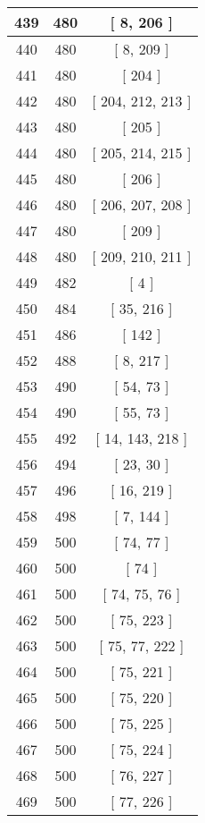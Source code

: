 \begin{center}
\begin{longtable}[H]{|| c c c ||}
439 & 480 & [ 8, 206 ]
\\\hline
440 & 480 & [ 8, 209 ]
\\\hline
441 & 480 & [ 204 ]
\\\hline
442 & 480 & [ 204, 212, 213 ]
\\\hline
443 & 480 & [ 205 ]
\\\hline
444 & 480 & [ 205, 214, 215 ]
\\\hline
445 & 480 & [ 206 ]
\\\hline
446 & 480 & [ 206, 207, 208 ]
\\\hline
447 & 480 & [ 209 ]
\\\hline
448 & 480 & [ 209, 210, 211 ]
\\\hline
449 & 482 & [ 4 ]
\\\hline
450 & 484 & [ 35, 216 ]
\\\hline
451 & 486 & [ 142 ]
\\\hline
452 & 488 & [ 8, 217 ]
\\\hline
453 & 490 & [ 54, 73 ]
\\\hline
454 & 490 & [ 55, 73 ]
\\\hline
455 & 492 & [ 14, 143, 218 ]
\\\hline
456 & 494 & [ 23, 30 ]
\\\hline
457 & 496 & [ 16, 219 ]
\\\hline
458 & 498 & [ 7, 144 ]
\\\hline
459 & 500 & [ 74, 77 ]
\\\hline
460 & 500 & [ 74 ]
\\\hline
461 & 500 & [ 74, 75, 76 ]
\\\hline
462 & 500 & [ 75, 223 ]
\\\hline
463 & 500 & [ 75, 77, 222 ]
\\\hline
464 & 500 & [ 75, 221 ]
\\\hline
465 & 500 & [ 75, 220 ]
\\\hline
466 & 500 & [ 75, 225 ]
\\\hline
467 & 500 & [ 75, 224 ]
\\\hline
468 & 500 & [ 76, 227 ]
\\\hline
469 & 500 & [ 77, 226 ]
\\\hline
\end{longtable}
\end{center}
